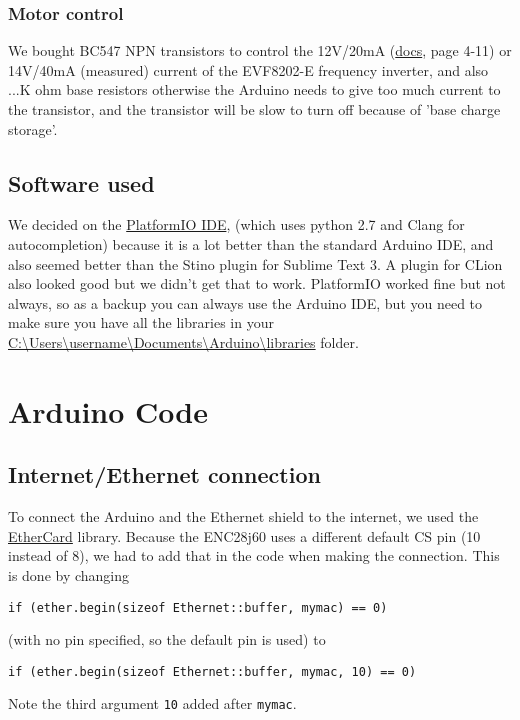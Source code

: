 \documentclass{article}
\begin{document}
		\subsubsection{Motor control}
		We bought BC547 NPN transistors to control the 12V/20mA (\href{http://download.lenze.com/TD/8201-8204__Inverter__v02-08__EN.pdf }{docs}, page 4-11) or 14V/40mA (measured) current of the EVF8202-E frequency inverter, and also ...K ohm base resistors otherwise the Arduino needs to give too much current to the transistor, and the transistor will be slow to turn off because of 'base charge storage'.
	
		\subsection{Software used}
		We decided on the \href{http://platformio.org/platformio-ide}{PlatformIO IDE}, (which uses python 2.7 and Clang for autocompletion) because it is a lot better than the standard Arduino IDE, and also seemed better than the Stino plugin for Sublime Text 3. A plugin for CLion also looked good but we didn't get that to work. PlatformIO worked fine but not always, so as a backup you can always use the Arduino IDE, but you need to make sure you have all the libraries in your \url{C:\Users\username\Documents\Arduino\libraries} folder.
	
	\section{Arduino Code}
		\subsection{Internet/Ethernet connection}
			To connect the Arduino and the Ethernet shield to the internet, we used the \href{https://github.com/jcw/ethercard}{EtherCard} library. Because the ENC28j60 uses a different default CS pin (10 instead of 8), we had to add that in the code when making the connection. This is done by changing
			\begin{lstlisting}
if (ether.begin(sizeof Ethernet::buffer, mymac) == 0)
			\end{lstlisting}
			(with no pin specified, so the default pin is used) to
			\begin{lstlisting}
if (ether.begin(sizeof Ethernet::buffer, mymac, 10) == 0)
			\end{lstlisting}
			Note the third argument \lstinline|10| added after \lstinline|mymac|.
\end{document}
